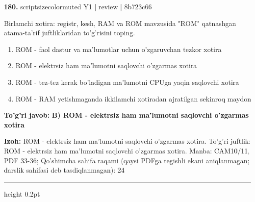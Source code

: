 \documentclass[10pt,a4paper]{article}
\begin{document}
{\bfseries\sffamily\color{ink} 180.} {scriptsizecolor{muted} Y1 | review | 8b723c66}
\par
Birlamchi xotira: registr, kesh, RAM va ROM mavzusida "ROM" qatnashgan atama-ta'rif juftliklaridan to'g'risini toping.
\begin{enumerate}[label=\Alph*),leftmargin=9mm]
\item ROM - faol dastur va ma'lumotlar uchun o'zgaruvchan tezkor xotira
\item ROM - elektrsiz ham ma'lumotni saqlovchi o'zgarmas xotira
\item ROM - tez-tez kerak bo'ladigan ma'lumotni CPUga yaqin saqlovchi xotira
\item ROM - RAM yetishmaganda ikkilamchi xotiradan ajratilgan sekinroq maydon
\end{enumerate}
\begin{tcolorbox}[enhanced,breakable,colback=teal!4,colframe=teal!60!black,boxrule=0.45pt,arc=1.2mm,left=2.7mm,right=2.7mm,top=1.8mm,bottom=1.8mm,before skip=2mm,after skip=2mm]
{\bfseries\sffamily\color{teal}To'g'ri javob:} \textbf{B) ROM - elektrsiz ham ma'lumotni saqlovchi o'zgarmas xotira}
\par\smallskip
{\bfseries Izoh:} ROM - elektrsiz ham ma'lumotni saqlovchi o'zgarmas xotira. To'g'ri juftlik: ROM - elektrsiz ham ma'lumotni saqlovchi o'zgarmas xotira. Manba: CAM10/11, PDF 33-36; Qo'shimcha sahifa raqami (qaysi PDFga tegishli ekani aniqlanmagan; darslik sahifasi deb tasdiqlanmagan): 24
\end{tcolorbox}
\vspace{2mm}\hrule height 0.2pt\vspace{3mm}
\end{document}
